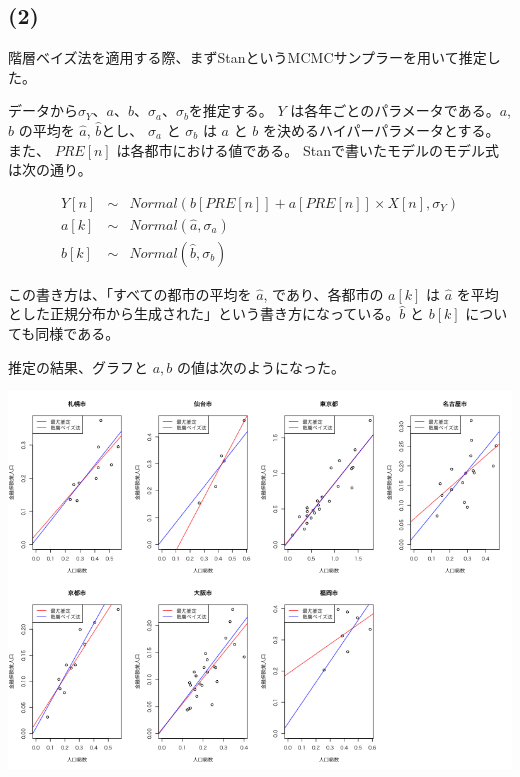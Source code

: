 \documentclass[a4j,xelatex,ja=standard,jafont=hiragino-pron, 9pt]{bxjsarticle}
\let\origfigure=\figure
\let\endorigfigure=\endfigure
\renewenvironment{figure}[1][]{%
  \origfigure[H]
}{%
  \endorigfigure
}
\begin{document}
\subsection*{(2)}

階層ベイズ法を適用する際、まずStanというMCMCサンプラーを用いて推定した。

データから\(\sigma_Y\)、\(a\)、\(b\)、\(\sigma_a\)、\(\sigma_b\)を推定する。
\(Y\) は各年ごとのパラメータである。\(a\), \(b\) の平均を \(\hat{a}\),
\(\hat{b}\)とし、 \(\sigma_a\) と \(\sigma_b\) は \(a\) と \(b\)
を決めるハイパーパラメータとする。また、 \(PRE[n]\)
は各都市における値である。 Stanで書いたモデルのモデル式は次の通り。

\begin{eqnarray}
  Y[n] &\sim& Normal(b[PRE[n]] + a[PRE[n]] \times X[n], \sigma_Y) \\
  a[k] &\sim& Normal(\hat{a}, \sigma_a) \\
  b[k] &\sim& Normal(\hat{b}, \sigma_b)
\end{eqnarray}

この書き方は、「すべての都市の平均を \(\hat{a}\), であり、各都市の
\(a[k]\) は \(\hat{a}\)
を平均とした正規分布から生成された」という書き方になっている。\(\hat{b}\)
と \(b[k]\) についても同様である。

推定の結果、グラフと $a, b$ の値は次のようになった。

\begin{figure}
\centering
\includegraphics[width=15cm]{../src/output/image/mle-mcmc.png}
\caption{階層ベイズ法(ハミルトンモンテカルロ法)と最尤推定法の比較}
\end{figure}
\end{document}
